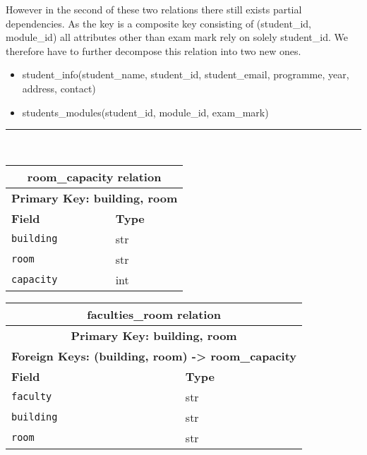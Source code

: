 \documentclass{article}
\begin{document}
However in the second of these two relations there still exists partial dependencies. As the key is a composite key consisting of (student\_id, module\_id) all attributes other than exam mark rely on solely student\_id. We therefore have to further decompose this relation into two new ones.



\begin{itemize}
    \item student\_info(student\_name, student\_id, student\_email, programme, year, address, contact)
    \item students\_modules(student\_id, module\_id, exam\_mark)
\end{itemize}

\par\noindent\rule{\textwidth}{1pt}\\



\begin{table}[H]
    \centering
    \begin{tabularx}{\textwidth}{|X|X|} %
    \hline
    \multicolumn{2}{|c|}{\textbf{room\_capacity relation}} \\
        \hline
    \multicolumn{2}{|c|}{\textbf{Primary Key: building, room}} \\
    \hline
        \textbf{Field} & \textbf{Type} \\
        \hline
        \verb|building| & str \\
        \hline
        \verb|room| & str \\
        \hline
        \verb|capacity| & int \\
        \hline
    \end{tabularx}
\end{table}

\begin{table}[H]
    \centering
    \begin{tabularx}{\textwidth}{|X|X|} %
    \hline
    \multicolumn{2}{|c|}{\textbf{faculties\_room relation}} \\
        \hline
    \multicolumn{2}{|c|}{\textbf{Primary Key: building, room}} \\
    \hline
    \multicolumn{2}{|c|}{\textbf{Foreign Keys: (building, room) -> room\_capacity}} \\
    \hline
        \textbf{Field} & \textbf{Type} \\
        \hline
        \verb|faculty| & str \\
        \hline
        \verb|building| & str \\
        \hline
        \verb|room| & str \\
        \hline
    \end{tabularx}
\end{table}
\end{document}
